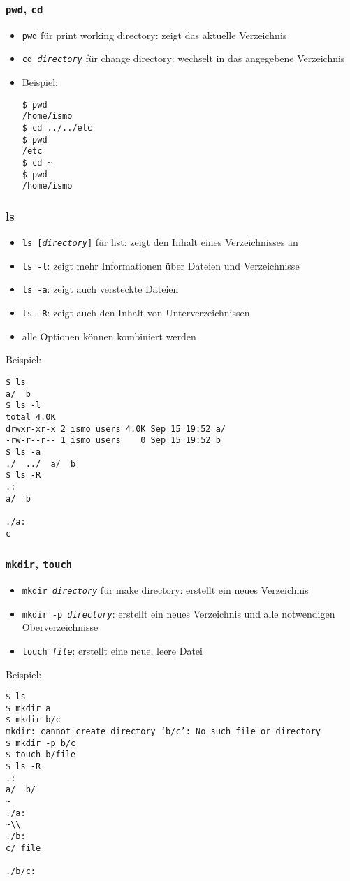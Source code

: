 \documentclass{article}
\begin{document}
      \subsubsection{\texttt{pwd}, \texttt{cd}}
        \begin{itemize}
          \item \texttt{pwd} für print working directory: zeigt das aktuelle Verzeichnis
          \item \texttt{cd \textit{directory}} für change directory: wechselt in das angegebene Verzeichnis
          \item Beispiel:
\begin{verbatim}
$ pwd
/home/ismo
$ cd ../../etc
$ pwd
/etc
$ cd ~
$ pwd
/home/ismo
\end{verbatim}
        \end{itemize}

      \subsubsection{ls}
        \begin{itemize}
          \item \texttt{ls [\textit{directory}]} für list: zeigt den Inhalt eines Verzeichnisses an
          \item \texttt{ls -l}: zeigt mehr Informationen über Dateien und Verzeichnisse
          \item \texttt{ls -a}: zeigt auch versteckte Dateien
          \item \texttt{ls -R}: zeigt auch den Inhalt von Unterverzeichnissen
          \item alle Optionen können kombiniert werden
        \end{itemize}
        Beispiel:
\begin{verbatim}
$ ls
a/  b
$ ls -l
total 4.0K
drwxr-xr-x 2 ismo users 4.0K Sep 15 19:52 a/
-rw-r--r-- 1 ismo users    0 Sep 15 19:52 b
$ ls -a
./  ../  a/  b
$ ls -R
.:
a/  b

./a:
c
\end{verbatim}

      \subsubsection{\texttt{mkdir}, \texttt{touch}}
        \begin{itemize}
          \item \texttt{mkdir \textit{directory}} für make directory: erstellt ein neues Verzeichnis
          \item \texttt{mkdir -p \textit{directory}}: erstellt ein neues Verzeichnis und alle notwendigen Oberverzeichnisse
          \item \texttt{touch \textit{file}}: erstellt eine neue, leere Datei
        \end{itemize}
        Beispiel:
\begin{verbatim}
$ ls
$ mkdir a
$ mkdir b/c
mkdir: cannot create directory ‘b/c’: No such file or directory
$ mkdir -p b/c
$ touch b/file
$ ls -R
.:
a/  b/
~
./a:
~\\                  
./b:
c/ file

./b/c:
\end{verbatim}
\end{document}
